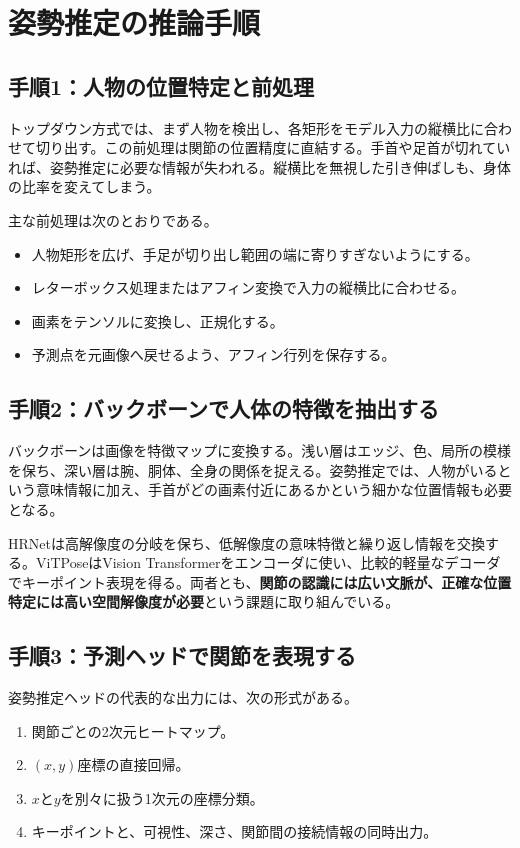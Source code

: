 \documentclass[11pt,a4paper,oneside]{report}
\begin{document}
\section{姿勢推定の推論手順}

\subsection{手順1：人物の位置特定と前処理}

トップダウン方式では、まず人物を検出し、各矩形をモデル入力の縦横比に合わせて切り出す。この前処理は関節の位置精度に直結する。手首や足首が切れていれば、姿勢推定に必要な情報が失われる。縦横比を無視した引き伸ばしも、身体の比率を変えてしまう。

主な前処理は次のとおりである。
\begin{itemize}
  \item 人物矩形を広げ、手足が切り出し範囲の端に寄りすぎないようにする。
  \item レターボックス処理またはアフィン変換で入力の縦横比に合わせる。
  \item 画素をテンソルに変換し、正規化する。
  \item 予測点を元画像へ戻せるよう、アフィン行列を保存する。
\end{itemize}

\subsection{手順2：バックボーンで人体の特徴を抽出する}

バックボーンは画像を特徴マップに変換する。浅い層はエッジ、色、局所の模様を保ち、深い層は腕、胴体、全身の関係を捉える。姿勢推定では、人物がいるという意味情報に加え、手首がどの画素付近にあるかという細かな位置情報も必要となる。

HRNetは高解像度の分岐を保ち、低解像度の意味特徴と繰り返し情報を交換する。ViTPoseはVision Transformerをエンコーダに使い、比較的軽量なデコーダでキーポイント表現を得る。両者とも、\textbf{関節の認識には広い文脈が、正確な位置特定には高い空間解像度が必要}という課題に取り組んでいる。

\subsection{手順3：予測ヘッドで関節を表現する}

姿勢推定ヘッドの代表的な出力には、次の形式がある。
\begin{enumerate}
  \item 関節ごとの2次元ヒートマップ。
  \item $(x,y)$座標の直接回帰。
  \item $x$と$y$を別々に扱う1次元の座標分類。
  \item キーポイントと、可視性、深さ、関節間の接続情報の同時出力。
\end{enumerate}
\end{document}
